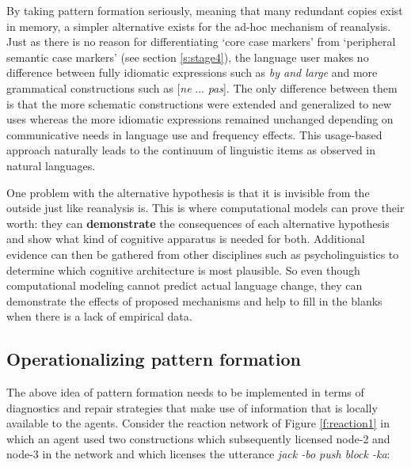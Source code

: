 By taking pattern formation seriously, meaning that many redundant copies exist in memory, a simpler alternative exists for the ad-hoc mechanism of reanalysis. Just as there is no reason for differentiating `core case markers' from `peripheral semantic case markers' (see section \ref{s:stage4}), the language user makes no difference between fully idiomatic expressions such as {\em by and large} and more grammatical constructions such as [{\em ne} ... {\em pas}]. The only difference between them is that the more schematic constructions were extended and generalized to new uses whereas the more idiomatic expressions remained unchanged depending on communicative needs in language use and frequency effects. This usage-based approach naturally leads to the continuum of linguistic items as observed in natural languages.

One problem with the alternative hypothesis is that it is invisible from the outside just like reanalysis is. This is where computational models can prove their worth: they can {\bfseries demonstrate} the consequences of each alternative hypothesis and show what kind of cognitive apparatus is needed for both. Additional evidence can then be gathered from other disciplines such as psycholinguistics to determine which cognitive architecture is most plausible. So even though computational modeling cannot predict actual language change, they can demonstrate the effects of proposed mechanisms and help to fill in the blanks when there is a lack of empirical data.

\subsection{Operationalizing pattern formation}
\label{s:operationalizing-patterns}

The above idea of pattern formation needs to be implemented in terms of diagnostics and repair strategies that make use of information that is locally available to the agents. Consider the reaction network of Figure \ref{f:reaction1} in which an agent used two constructions which subsequently licensed node-2 and node-3 in the network and which licenses the utterance {\em jack -bo push block -ka}:

